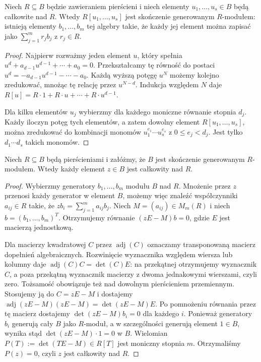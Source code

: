 \begin{lemat}
\label{lem:integral-finite}
Niech $R\subseteq B$ będzie zawieraniem pierścieni i niech
elementy $u_1,\dots,u_s\in B$ będą całkowite nad $R$.
Wtedy $R[u_1,\dots,u_s]$ jest skończenie generowanym
$R$-modułem: istnieją elementy $b_1,\dots,b_m$
tej algebry takie, że każdy jej element można zapisać jako
$\sum_{j=1}^m r_jb_j$ z $r_j\in R$.
\end{lemat}
\begin{proof}
Najpierw rozważmy jeden element $u$, który spełnia
$u^d+a_{d-1}u^{d-1}+\cdots+a_0=0$.
Przekształcamy tę równość do postaci
$u^d=-a_{d-1}u^{d-1}-\cdots-a_0$.
Każdą wyższą potęgę $u^N$ możemy kolejno zredukować,
mnożąc tę relację przez $u^{N-d}$. Indukcja względem $N$
daje $R[u]=R\cdot1+R\cdot u+\cdots+R\cdot u^{d-1}$.

Dla kilku elementów $u_j$ wybierzmy dla każdego moniczne
równanie stopnia $d_j$. Każdy iloczyn potęg tych elementów,
a zatem dowolny element $R[u_1,\dots,u_s]$,
można zredukować do kombinacji monomów
$u_1^{e_1}\cdots u_s^{e_s}$ z $0\le e_j<d_j$.
Jest tylko $d_1\cdots d_s$ takich monomów.
\end{proof}

\begin{lemat}
\label{lem:determinant-integral}
Niech $R\subseteq B$ będą pierścieniami i załóżmy, że $B$
jest skończenie generowanym $R$-modułem. Wtedy każdy element
$z\in B$ jest całkowity nad $R$.
\end{lemat}
\begin{proof}
Wybierzmy generatory $b_1,\dots,b_m$ modułu $B$ nad $R$.
Mnożenie przez $z$ przenosi każdy generator w element $B$,
możemy więc znaleźć współczynniki $a_{ij}\in R$ takie, że
$zb_i=\sum_{j=1}^m a_{ij}b_j$.
Niech $M=(a_{ij})\in M_m(R)$ i niech
$b=(b_1,\dots,b_m)^T$. Otrzymujemy równanie
$(zE-M)b=0$, gdzie $E$ jest macierzą jednostkową.

Dla macierzy kwadratowej $C$ przez $\operatorname{adj}(C)$
oznaczamy transponowaną macierz dopełnień algebraicznych.
Rozwinięcie wyznacznika względem wiersza lub kolumny daje
$\operatorname{adj}(C)C=\det(C)E$: na przekątnej otrzymujemy
wyznacznik $C$, a poza przekątną wyznacznik macierzy
z dwoma jednakowymi wierszami, czyli zero.
Tożsamość obowiązuje też nad dowolnym pierścieniem przemiennym.
Stosujemy ją do $C=zE-M$ i dostajemy
$\operatorname{adj}(zE-M)(zE-M)=\det(zE-M)E$.
Po pomnożeniu równania przez tę macierz dostajemy
$\det(zE-M)b_i=0$ dla każdego $i$.
Ponieważ generatory $b_i$ generują cały $B$ jako $R$-moduł,
a w szczególności generują element $1\in B$,
wynika stąd $\det(zE-M)\cdot1=0$ w $B$.
Wielomian $P(T):=\det(TE-M)\in R[T]$ jest moniczny
stopnia $m$. Otrzymaliśmy $P(z)=0$, czyli $z$ jest całkowity nad $R$.
\end{proof}

